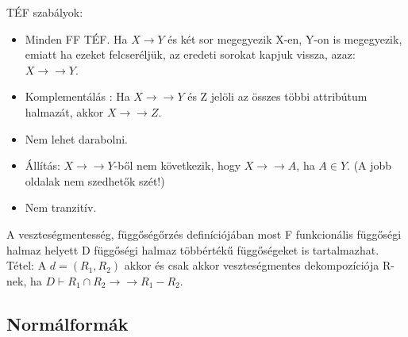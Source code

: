 \documentclass[margin=0px]{article}
\begin{document}
TÉF szabályok:
\begin{itemize}
    \item Minden FF TÉF. Ha $X \to Y$ és két sor megegyezik X-en, Y-on is megegyezik, emiatt ha ezeket felcseréljük, az eredeti sorokat kapjuk vissza, azaz: $X \to\to Y$.
    \item Komplementálás : Ha $X \to\to Y$ és Z jelöli az összes többi attribútum halmazát, akkor $X \to\to Z$.
    \item Nem lehet darabolni.
    \item Állítás: $X \to\to Y$-ből nem következik, hogy $X \to\to A$, ha $A \in Y$. (A jobb oldalak nem szedhetők szét!)
    \item Nem tranzitív.
\end{itemize}
A veszteségmentesség, függőségőrzés definíciójában most F funkcionális függőségi halmaz helyett D függőségi halmaz többértékű függőségeket is tartalmazhat. \\
Tétel: A $d=(R_1,R_2)$ akkor és csak akkor veszteségmentes dekompozíciója R-nek, ha $D \vdash R_1 \cap R_2 \to\to R_1-R_2$.

\subsection{Normálformák}
\end{document}
